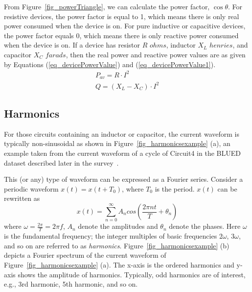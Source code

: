 

From Figure~\ref{fig_powerTriangle},
we can calculate the power factor, $\cos\theta$.
For resistive devices, the power factor is equal to 1,
which means there is only real power consumed when the device is on. 
For pure inductive or capacitive devices, the power factor equals 0,
which means there is only reactive power consumed when the device is on.
If a device has resistor $R$ $ohms$, inductor $X_L$ $henries$, and capacitor $X_C$ $farads$,
then the real power and reactive power values are
as given by 
Equations (\ref{eq_devicePowerValue}) and (\ref{eq_devicePowerValue1}).
\begin{subequations}
\begin{align}
\label{eq_devicePowerValue}
P_{av}=R\cdot I^2 \\
Q=(X_L - X_C)\cdot I^2 \label{eq_devicePowerValue1}
\end{align}
\end{subequations}

\subsection{Harmonics}
For those circuits containing an inductor or capacitor,
the current waveform is typically non-sinusoidal as shown in
Figure~\ref{fig_harmonicsexample} (a), an example taken from
the current waveform of a cycle of Circuit4 in the BLUED dataset
described later in the survey~\cite{anderson2012blued}. 

This (or any) type of waveform can be expressed as a Fourier series.
Consider a periodic waveform $x(t) = x(t+T_0)$,
where $T_0$ is the period.
$x(t)$ can be
rewritten as
\begin{equation}
x(t) = \sum_{n=0}^{\infty}A_n cos(\frac{2\pi nt}{T}+\theta_n)
\end{equation}
where $\omega = \frac{2\pi}{T} = 2\pi f$,
$A_n$ denote the amplitudes and $\theta_n$ denote the phases.
Here $\omega$ is the fundamental frequency;
the integer multiples of basic frequencies $2\omega$, $3\omega$,
and so on are referred to as {\it harmonics}.
Figure~\ref{fig_harmonicsexample} (b) 
depicts a Fourier spectrum of
the current waveform of Figure~\ref{fig_harmonicsexample} (a).
The x-axis is the ordered harmonics and
y-axis shows the amplitude of harmonics.
Typically, odd harmonics are of interest, e.g.,
3rd harmonic, 5th harmonic, and so on.



